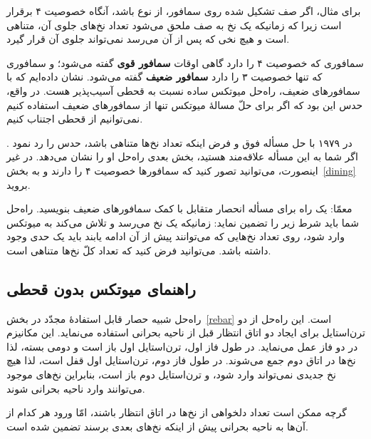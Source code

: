 \documentclass{book}
\newcommand{\clearemptydoublepage}{}%
\begin{document}
    برای مثال، اگر صف تشکیل شده روی سمافور، از نوع   باشد،
    آنگاه خصوصیت ۴ برقرار است زیرا که زمانیکه یک نخ به صف ملحق می‌شود تعداد نخ‌های جلوی آن، متناهی است و هیچ نخی که پس از آن می‌رسد 
    نمی‌تواند جلوی آن قرار گیرد. 

    سمافوری که خصوصیت ۴ را دارد گاهی اوقات \textbf{سمافور قوی} گفته می‌شود؛ و 
    سمافوری که تنها خصوصیت ۳ را دارد \textbf{سمافور ضعیف} گفته می‌شود.
    نشان‌ داده‌ایم که  با سمافورهای ضعیف، راه‌حل میوتکس ساده نسبت به قحطی آسیب‌پذیر هست.
    در واقع، حدس  این بود که اگر برای حلّ مسالهٔ میوتکس تنها از سمافورهای ضعیف استفاده کنیم نمی‌توانیم از قحطی اجتناب کنیم. 

    در ۱۹۷۹  با حل مسأله فوق و فرض اینکه تعداد نخ‌ها متناهی باشد، حدس    را رد نمود \cite{morris}. 
    اگر شما به این مسأله علاقه‌مند هستید، بخش بعدی راه‌حل او را نشان می‌دهد. در غیر اینصورت، می‌توانید تصور کنید که سمافورها خصوصیت ۴ 
    را دارند و به بخش~\ref{dining} بروید. 

    معمّا: یک راه برای مسأله انحصار متقابل با کمک سمافورهای ضعیف بنویسید. راه‌حل شما باید شرط زیر را تضمین نماید: 
    زمانیکه یک نخ می‌رسد و تلاش می‌کند به میوتکس وارد شود،  روی تعداد نخ‌هایی که می‌توانند پیش از آن ادامه یابند باید یک حدی وجود داشته باشد. 
    می‌توانید فرض کنید که تعداد کلّ نخ‌ها متناهی است. 
    

\clearemptydoublepage
\subsection{راهنمای میوتکس بدون قحطی}
\label{morris}

    راه‌حل  شبیه حصار قابل استفادهٔ مجدّد در بخش~\ref{rebar} است. 
    این راه‌حل از دو ترن‌استایل برای ایجاد دو اتاق انتظار قبل از ناحیه بحرانی استفاده می‌نماید. این مکانیزم در دو فاز عمل می‌نماید. 
    در طول فاز اول، ترن‌استایل اول باز است و دومی بسته، لذا نخ‌ها در اتاق دوم جمع می‌شوند. در طول فاز دوم، ترن‌استایل اول قفل است، لذا هیچ 
    نخ جدیدی نمی‌تواند وارد شود، و ترن‌استایل دوم باز است، بنابراین نخ‌های موجود می‌توانند وارد ناحیه بحرانی شوند. 

    گرچه ممکن است تعداد دلخواهی از نخ‌ها در اتاق انتظار باشند، امّا  ورود هر کدام از آن‌ها به ناحیه بحرانی پیش از اینکه نخ‌های بعدی برسند تضمین شده است. 
\end{document}
